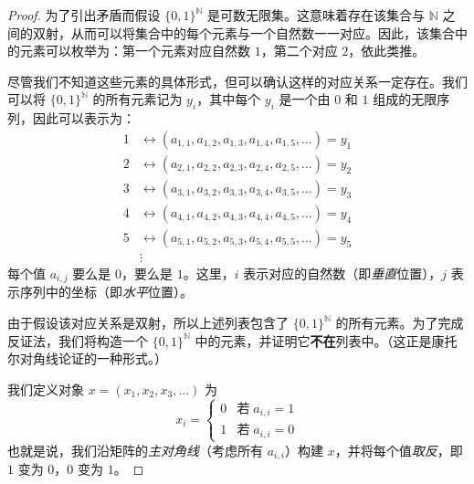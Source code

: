 \begin{proof}
    为了引出矛盾而假设 $\{0, 1\}^{\mathbb{N}}$ 是可数无限集。这意味着存在该集合与 $\mathbb{N}$ 之间的双射，从而可以将集合中的每个元素与一个自然数一一对应。因此，该集合中的元素可以枚举为：第一个元素对应自然数 $1$，第二个对应 $2$，依此类推。

    尽管我们不知道这些元素的具体形式，但可以确认这样的对应关系一定存在。我们可以将 $\{0, 1\}^{\mathbb{N}}$ 的所有元素记为 $y_i$，其中每个 $y_i$ 是一个由 $0$ 和 $1$ 组成的无限序列，因此可以表示为：
    \begin{align*}
        1 & \leftrightarrow (a_{1,1} , a_{1,2} , a_{1,3} , a_{1,4} , a_{1,5} , \dots) = y_1 \\
        2 & \leftrightarrow (a_{2,1} , a_{2,2} , a_{2,3} , a_{2,4} , a_{2,5} , \dots) = y_2 \\
        3 & \leftrightarrow (a_{3,1} , a_{3,2} , a_{3,3} , a_{3,4} , a_{3,5} , \dots) = y_3 \\
        4 & \leftrightarrow (a_{4,1} , a_{4,2} , a_{4,3} , a_{4,4} , a_{4,5} , \dots) = y_4 \\
        5 & \leftrightarrow (a_{5,1} , a_{5,2} , a_{5,3} , a_{5,4} , a_{5,5} , \dots) = y_5 \\
          & \vdots
    \end{align*}
    每个值 $a_{i,j}$ 要么是 $0$，要么是 $1$。这里，$i$ 表示对应的自然数（即\emph{垂直}位置），$j$ 表示序列中的坐标（即\emph{水平}位置）。

    由于假设该对应关系是双射，所以上述列表包含了 $\{0, 1\}^{\mathbb{N}}$ 的所有元素。为了完成反证法，我们将构造一个 $\{0, 1\}^{\mathbb{N}}$ 中的元素，并证明它\textbf{不在}列表中。（这正是康托尔对角线论证的一种形式。）

    我们定义对象 $x = (x_1, x_2, x_3, \dots)$ 为
    \[x_i = \begin{cases}
            0 & \text{若}\; a_{i,i} = 1 \\
            1 & \text{若}\; a_{i,i} = 0
        \end{cases}\]
    也就是说，我们沿矩阵的\emph{主对角线}（考虑所有 $a_{i,i}$）构建 $x$，并将每个值\emph{取反}，即 $1$ 变为 $0$，$0$ 变为 $1$。


\end{proof}
